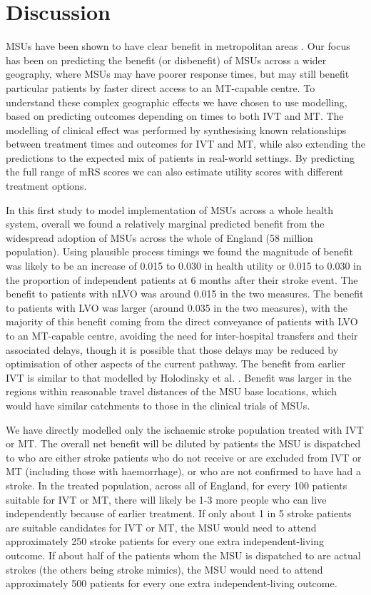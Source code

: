 \section{Discussion}


MSUs have been shown to have clear benefit in metropolitan areas \cite{fatima_mobile_2020, chen_systematic_2022}. Our focus has been on predicting the benefit (or disbenefit) of MSUs across a wider geography, where MSUs may have poorer response times, but may still benefit particular patients by faster direct access to an MT-capable centre. To understand these complex geographic effects we have chosen to use modelling, based on predicting outcomes depending on times to both IVT and MT. The modelling of clinical effect was performed by synthesising known relationships between treatment times and outcomes for IVT and MT, while also extending the predictions to the expected mix of patients in real-world settings. By predicting the full range of mRS scores we can also estimate utility scores with different treatment options.

In this first study to model implementation of MSUs across a whole health system, overall we found a relatively marginal predicted benefit from the widespread adoption of MSUs across the whole of England (58 million population). Using plausible process timings we found the magnitude of benefit was likely to be an increase of 0.015 to 0.030 in health utility or 0.015 to 0.030 in the proportion of independent patients at 6 months after their stroke event. The benefit to patients with nLVO was around 0.015 in the two measures. The benefit to patients with LVO was larger (around 0.035 in the two measures), with the majority of this benefit coming from the direct conveyance of patients with LVO to an MT-capable centre, avoiding the need for inter-hospital transfers and their associated delays, though it is possible that those delays may be reduced by optimisation of other aspects of the current pathway. The benefit from earlier IVT is similar to that modelled by Holodinsky et al. \cite{holodinsky_jessalyn_k_what_2020}. Benefit was larger in the regions within reasonable travel distances of the MSU base locations, which would have similar catchments to those in the clinical trials of MSUs.

We have directly modelled only the ischaemic stroke population treated with IVT or MT. The overall net benefit will be diluted by patients the MSU is dispatched to who are either stroke patients who do not receive or are excluded from IVT or MT (including those with haemorrhage), or who are not confirmed to have had a stroke. In the treated population, across all of England, for every 100 patients suitable for IVT or MT, there will likely be 1-3 more people who can live independently because of earlier treatment. If only about 1 in 5 stroke patients are suitable candidates for IVT or MT, the MSU would need to attend approximately 250 stroke patients for every one extra independent-living outcome. If about half of the patients whom the MSU is dispatched to are actual strokes (the others being stroke mimics), the MSU would need to attend approximately 500 patients for every one extra independent-living outcome. 

